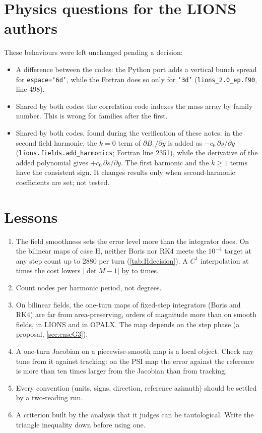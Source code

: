 \section{Physics questions for the LIONS authors}
These behaviours were left unchanged pending a decision:
\begin{itemize}
\item A difference between the codes: the Python port adds a vertical bunch spread for \texttt{espace='6d'}, while the
Fortran does so only for \texttt{'3d'} (\texttt{lions\_2.0\_ep.f90}, line 498).
\item Shared by both codes: the correlation code indexes the mass array by family number.
This is wrong for families after the first.
\item Shared by both codes, found during the verification of these notes: in the second field harmonic, the $k=0$ term
of $\partial B_z/\partial y$ is added as $-c_0\,\partial s/\partial y$ (\texttt{lions.fields.add\_harmonics}; Fortran
line 2351), while the derivative of the added polynomial gives $+c_0\,\partial s/\partial y$.
The first harmonic and the $k\ge1$ terms have the consistent sign.
It changes results only when second-harmonic coefficients are set; not tested.
\end{itemize}

\section{Lessons}
\begin{enumerate}
\item The field smoothness sets the error level more than the integrator does.
On the bilinear maps of case H, neither Boris nor RK4 meets the $10^{-4}$ target at any step count up to 2880 per turn
(\cref{tab:Hdecision}).
A $C^1$ interpolation at \HCostHerm{} times the cost lowers $|\det M-1|$ by \HDetRatioMin{} to \HDetRatioMax{} times.
\item Count nodes per harmonic period, not degrees.
\item On bilinear fields, the one-turn maps of fixed-step integrators (Boris and RK4) are far from area-preserving,
orders of magnitude more than on smooth fields, in LIONS and in OPALX.
The map depends on the step phase (a proposal, \cref{sec:caseG3}).
\item A one-turn Jacobian on a piecewise-smooth map is a local object.
Check any tune from it against tracking: on the PSI map the error against the reference is more than ten times larger from the Jacobian than from tracking.
\item Every convention (units, signs, direction, reference azimuth) should be settled by a two-reading run.
\item A criterion built by the analysis that it judges can be tautological.
Write the triangle inequality down before using one.
\end{enumerate}
